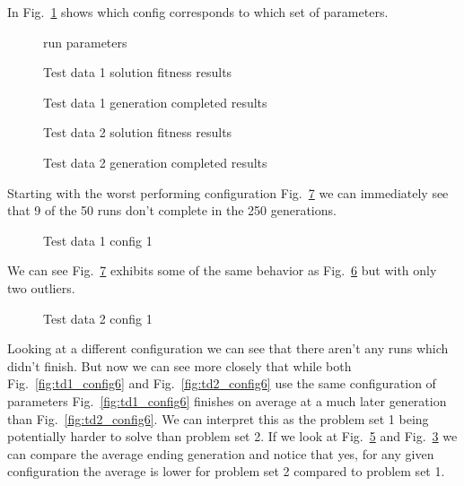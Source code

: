 \documentclass[conference]{IEEEtran}
\begin{document}
In Fig.~\ref{fig:run_params} shows which config corresponds to which set of parameters.\\


\begin{figure}[H]
\centering

\caption{run parameters}
\label{fig:run_params}
\end{figure}

\begin{figure}[H]
\centering

\caption{Test data 1 solution fitness results}
\label{fig:td1_fitness}
\end{figure}


\begin{figure}[H]
\centering

\caption{Test data 1 generation completed results}
\label{fig:td1_gens}
\end{figure}

\begin{figure}[H]
\centering

\caption{Test data 2 solution fitness results}
\label{fig:td2_fitness}
\end{figure}


\begin{figure}[H]
\centering

\caption{Test data 2 generation completed results}
\label{fig:td2_gens}
\end{figure}



Starting with the worst performing configuration Fig.~\ref{fig:td2_config1} we can immediately see that 9 of the 50 runs don't complete in the 250 generations. 

\begin{figure}[H]
    
    \caption{Test data 1 config 1}
    \label{fig:td1_config1}
\end{figure}

We can see Fig.~\ref{fig:td2_config1} exhibits some of the same behavior as Fig.~\ref{fig:td1_config1} but with only two outliers.

\begin{figure}[H]
    \centering
    
    \caption{Test data 2 config 1}
    \label{fig:td2_config1}
\end{figure}


Looking at a different configuration we can see that there aren't any runs which didn't finish. But now we can see more closely that while both Fig.~\ref{fig:td1_config6} and Fig.~\ref{fig:td2_config6} use the same configuration of parameters Fig.~\ref{fig:td1_config6} finishes on average at a much later generation than Fig.~\ref{fig:td2_config6}. We can interpret this as the problem set 1 being potentially harder to solve than problem set 2. If we look at Fig.~\ref{fig:td2_gens} and Fig.~\ref{fig:td1_gens} we can compare the average ending generation and notice that yes, for any given configuration the average is lower for problem set 2 compared to problem set 1. 
\end{document}
